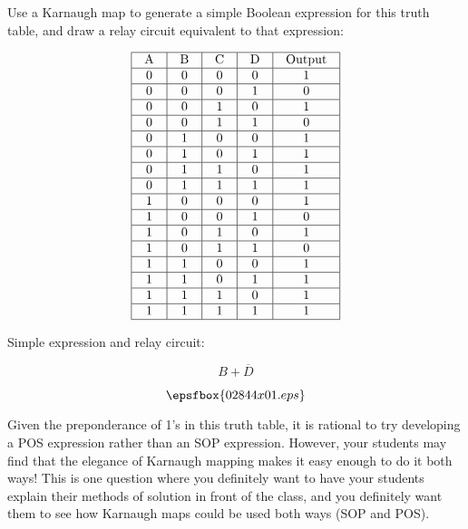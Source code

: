 

Use a Karnaugh map to generate a simple Boolean expression for this truth table, and draw a relay circuit equivalent to that expression:


$$\vbox{\offinterlineskip
\halign{\strut
\vrule \quad\hfil # \ \hfil & 
\vrule \quad\hfil # \ \hfil & 
\vrule \quad\hfil # \ \hfil & 
\vrule \quad\hfil # \ \hfil & 
\vrule \quad\hfil # \ \hfil \vrule \cr
\noalign{\hrule}
%
A & B & C & D & Output \cr
%
\noalign{\hrule}
%
0 & 0 & 0 & 0 & 1 \cr
%
\noalign{\hrule}
%
0 & 0 & 0 & 1 & 0 \cr
%
\noalign{\hrule}
%
0 & 0 & 1 & 0 & 1 \cr
%
\noalign{\hrule}
%
0 & 0 & 1 & 1 & 0 \cr
%
\noalign{\hrule}
%
0 & 1 & 0 & 0 & 1 \cr
%
\noalign{\hrule}
%
0 & 1 & 0 & 1 & 1 \cr
%
\noalign{\hrule}
%
0 & 1 & 1 & 0 & 1 \cr
%
\noalign{\hrule}
%
0 & 1 & 1 & 1 & 1 \cr
%
\noalign{\hrule}
%
1 & 0 & 0 & 0 & 1 \cr
%
\noalign{\hrule}
%
1 & 0 & 0 & 1 & 0 \cr
%
\noalign{\hrule}
%
1 & 0 & 1 & 0 & 1 \cr
%
\noalign{\hrule}
%
1 & 0 & 1 & 1 & 0 \cr
%
\noalign{\hrule}
%
1 & 1 & 0 & 0 & 1 \cr
%
\noalign{\hrule}
%
1 & 1 & 0 & 1 & 1 \cr
%
\noalign{\hrule}
%
1 & 1 & 1 & 0 & 1 \cr
%
\noalign{\hrule}
%
1 & 1 & 1 & 1 & 1 \cr
%
\noalign{\hrule}
} %
}$$ %







Simple expression and relay circuit:

$$B + \overline{D}$$

$$\epsfbox{02844x01.eps}$$







Given the preponderance of 1's in this truth table, it is rational to try developing a POS expression rather than an SOP expression.  However, your students may find that the elegance of Karnaugh mapping makes it easy enough to do it both ways!  This is one question where you definitely want to have your students explain their methods of solution in front of the class, and you definitely want them to see how Karnaugh maps could be used both ways (SOP and POS).

